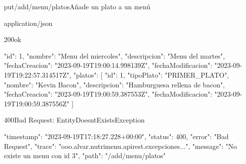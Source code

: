 \begin{apiRoute}{put}{/add/menu/platos}{Añade un plato a un menú}
	\begin{routeParameter}
	\end{routeParameter}
	
	\begin{routeResponse}{application/json}
		\begin{routeResponseItem}{200}{ok}
			\begin{routeResponseItemBody}
{
    "id": 1,
    "nombre": "Menu del miercoles",
    "descripcion": "Menu del martes",
    "fechaCreacion": "2023-09-19T19:00:14.998139Z",
    "fechaModificacion": "2023-09-19T19:22:57.314517Z",
    "platos": [
        {
            "id": 1,
            "tipoPlato": "PRIMER_PLATO",
            "nombre": "Kevin Bacon",
            "descripcion": "Hamburguesa rellena de bacon",
            "fechaCreacion": "2023-09-19T19:00:59.387553Z",
            "fechaModificacion": "2023-09-19T19:00:59.387556Z"
        }
    ]
}
			\end{routeResponseItemBody}
		\end{routeResponseItem}
		\begin{routeResponseItem}{400}{Bad Request: EntityDoesntExistsException}
			\begin{routeResponseItemBody}
{
    "timestamp": "2023-09-19T17:18:27.228+00:00",
    "status": 400,
    "error": "Bad Request",
    "trace": "ooo.alvar.nutrimenu.apirest.excepciones...",
    "message": "No existe un menu con id 3",
    "path": "/add/menu/platos"
}
			\end{routeResponseItemBody}
		\end{routeResponseItem}
	\end{routeResponse}
\end{apiRoute}

